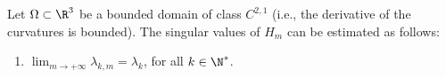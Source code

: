 \begin{theorem}\label{thm:main}
Let $\Omega\subset\R^3$ be a bounded domain of class $C^{2,1}$ (i.e., the derivative of the curvatures is bounded). The singular values of $H_m$ can be estimated as follows:
\begin{enumerate}[label=(\roman*)]\item $\lim_{m\to+\infty}\lambda_{k,m}=\lambda_k$, for all $k\in\N^*$.
\end{enumerate}\end{theorem}
